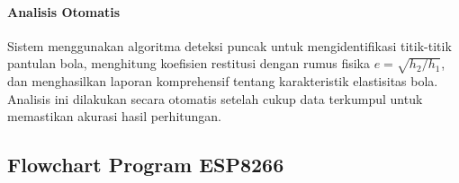 \paragraph{Analisis Otomatis} Sistem menggunakan algoritma deteksi puncak untuk mengidentifikasi titik-titik pantulan bola, menghitung koefisien restitusi dengan rumus fisika $e = \sqrt{h_2/h_1}$, dan menghasilkan laporan komprehensif tentang karakteristik elastisitas bola. Analisis ini dilakukan secara otomatis setelah cukup data terkumpul untuk memastikan akurasi hasil perhitungan.

\newpage

\subsection{Flowchart Program ESP8266}

